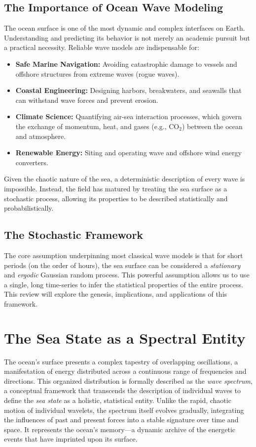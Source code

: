 \documentclass[11pt,letterpaper]{article}
\begin{document}
\subsection{The Importance of Ocean Wave Modeling}
The ocean surface is one of the most dynamic and complex interfaces on Earth. Understanding and predicting its behavior is not merely an academic pursuit but a practical necessity. Reliable wave models are indispensable for:
\begin{itemize}
    \item \textbf{Safe Marine Navigation:} Avoiding catastrophic damage to vessels and offshore structures from extreme waves (rogue waves).
    \item \textbf{Coastal Engineering:} Designing harbors, breakwaters, and seawalls that can withstand wave forces and prevent erosion.
    \item \textbf{Climate Science:} Quantifying air-sea interaction processes, which govern the exchange of momentum, heat, and gases (e.g., CO$_2$) between the ocean and atmosphere.
    \item \textbf{Renewable Energy:} Siting and operating wave and offshore wind energy converters.
\end{itemize}
Given the chaotic nature of the sea, a deterministic description of every wave is impossible. Instead, the field has matured by treating the sea surface as a stochastic process, allowing its properties to be described statistically and probabilistically.

\subsection{The Stochastic Framework}
The core assumption underpinning most classical wave models is that for short periods (on the order of hours), the sea surface can be considered a \textit{stationary} and \textit{ergodic} Gaussian random process. This powerful assumption allows us to use a single, long time-series to infer the statistical properties of the entire process. This review will explore the genesis, implications, and applications of this framework.

\section{The Sea State as a Spectral Entity}

The ocean's surface presents a complex tapestry of overlapping oscillations, a manifestation of energy distributed across a continuous range of frequencies and directions. This organized distribution is formally described as the \textit{wave spectrum}, a conceptual framework that transcends the description of individual waves to define the \textit{sea state} as a holistic, statistical entity. Unlike the rapid, chaotic motion of individual wavelets, the spectrum itself evolves gradually, integrating the influences of past and present forces into a stable signature over time and space. It represents the ocean's memory—a dynamic archive of the energetic events that have imprinted upon its surface.
\end{document}

